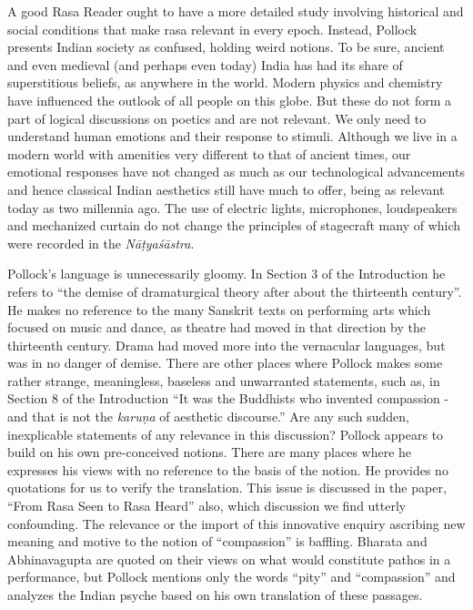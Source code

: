 A good Rasa Reader ought to have a more detailed study involving historical and social conditions that make rasa relevant in every epoch. Instead, Pollock presents Indian society as confused, holding weird notions. To be sure, ancient and even medieval (and perhaps even today) India has had its share of superstitious beliefs, as anywhere in the world. Modern physics and chemistry have influenced the outlook of all people on this globe. But these do not form a part of logical discussions on poetics and are not relevant. We only need to understand human emotions and their response to stimuli. Although we live in a modern world with amenities very different to that of ancient times, our emotional responses have not changed as much as our technological advancements and hence classical Indian aesthetics still have much to offer, being as relevant today as two millennia ago. The use of electric lights, microphones, loudspeakers and mechanized curtain do not change the principles of stagecraft many of which were recorded in the \textit{Nāṭyaśāstra}.

Pollock’s language is unnecessarily gloomy. In Section 3 of the Introduction he refers to “the demise of dramaturgical theory after about the thirteenth century”. He makes no reference to the many Sanskrit texts on performing arts which focused on music and dance, as theatre had moved in that direction by the thirteenth century. Drama had moved more into the vernacular languages, but was in no danger of demise. There are other places where Pollock makes some rather strange, meaningless, baseless and unwarranted statements, such as, in Section 8 of the Introduction “It was the Buddhists who invented compassion - and that is not the \textit{karuṇa} of aesthetic discourse.” Are any such sudden, inexplicable statements of any relevance in this discussion? Pollock appears to build on his own pre-conceived notions. There are many places where he expresses his views with no reference to the basis of the notion. He provides no quotations for us to verify the translation. This issue is discussed in the paper, “From Rasa Seen to Rasa Heard” also, which discussion we find utterly confounding. The relevance or the import of this innovative enquiry ascribing new meaning and motive to the notion of “compassion” is baffling. Bharata and Abhinavagupta are quoted on their views on what would constitute pathos in a performance, but Pollock mentions only the words “pity” and “compassion” and analyzes the Indian psyche based on his own translation of these passages.

